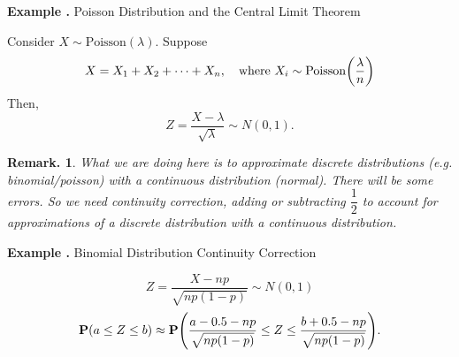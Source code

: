 \documentclass[12pt, a4paper]{article}
\newcounter{index}[subsection]
\newenvironment*{eg}{\begin{framed}\par\noindent\textbf{Example \thesubsection.\stepcounter{index}\theindex}}{\par\end{framed}}
\newtheorem*{rmk}{Remark.}
\def\P{\vb{P}}
\begin{document}
\begin{eg}
	Poisson Distribution and the Central Limit Theorem\par 
	Consider $X\sim\text{Poisson}(\lambda)$. Suppose \[X=X_1+X_2+\cdots+X_n,\quad\text{where }X_i\sim\text{Poisson}\qty(\dfrac{\lambda}{n})\] Then, \[Z=\dfrac{X-\lambda}{\sqrt{\lambda}}\sim N(0,1).\]
\end{eg}
\begin{rmk}
	What we are doing here is to approximate discrete distributions (e.g. binomial/poisson) with a continuous distribution (normal). There will be some errors. So we need \emph{continuity correction}, adding or subtracting $\dfrac{1}{2}$ to account for approximations of a discrete distribution with a continuous distribution.	
\end{rmk}
\begin{eg}
	Binomial Distribution Continuity Correction\par 
	\[Z=\dfrac{X-np}{\sqrt{np(1-p)}}\sim N(0,1)\] \[\P(a\leq Z\leq b)\approx\P\qty(\dfrac{a-0.5-np}{\sqrt{np(1-p)}}\leq Z\leq\dfrac{b+0.5-np}{\sqrt{np(1-p)}}).\]
\end{eg}
\end{document}
